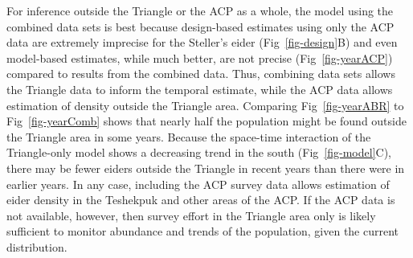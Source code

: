 \documentclass[
  10pt,
  letterpaper,
]{article}
\begin{document}
For inference outside the Triangle or the ACP as a whole, the model
using the combined data sets is best because design-based estimates
using only the ACP data are extremely imprecise for the Steller's eider
(Fig~\ref{fig-design}B) and even model-based estimates, while much
better, are not precise (Fig~\ref{fig-yearACP}) compared to results from
the combined data. Thus, combining data sets allows the Triangle data to
inform the temporal estimate, while the ACP data allows estimation of
density outside the Triangle area. Comparing Fig~\ref{fig-yearABR} to
Fig~\ref{fig-yearComb} shows that nearly half the population might be found outside the Triangle area in some years. Because the
space-time interaction of the Triangle-only model shows a decreasing
trend in the south (Fig~\ref{fig-model}C), there may be fewer eiders
outside the Triangle in recent years than there were in earlier years.
In any case, including the ACP survey data allows estimation of eider
density in the Teshekpuk and other areas of the ACP. If the ACP data is
not available, however, then survey effort in the Triangle area only is
likely sufficient to monitor abundance and trends of the population,
given the current distribution.
\end{document}
